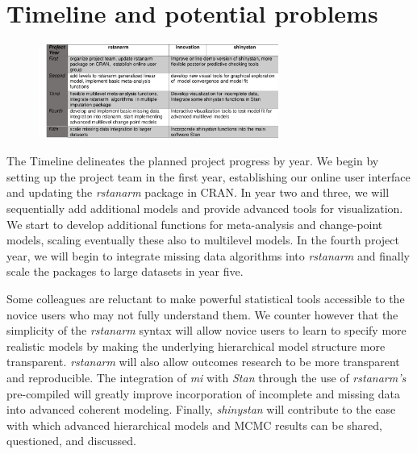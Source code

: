 \documentclass[11pt,notitlepage]{article}
\begin{document}
\section*{Timeline and potential problems}

\begin{figure} %
 \vspace*{-12pt}
    \centering
  \includegraphics[width=0.7\textwidth]{Figures/Timeline.pdf}
 \vspace*{-15pt}
\end{figure}

The Timeline delineates the planned project progress by year. We begin by setting up the project team in 
the first year, establishing our online user interface and updating the \textit{rstanarm} package in CRAN. 
In year two and three, we will sequentially add additional models and provide advanced tools 
for visualization. We start to develop additional functions for meta-analysis and 
change-point models, scaling eventually these also to multilevel models. In the fourth project year, we will begin to integrate 
missing data algorithms into \textit{rstanarm} and finally scale the packages to large datasets in year five.

Some colleagues are reluctant to make powerful statistical tools accessible to the novice users 
who may not fully understand them. We counter 
however that the simplicity of the \textit{rstanarm} syntax will allow novice users to learn to specify more realistic models by 
making the underlying hierarchical model structure more transparent.  \textit{rstanarm} will also allow outcomes research to be 
more transparent and reproducible. The integration of \textit{mi} with \textit{Stan} through the use of 
\textit{rstanarm's} pre-compiled will greatly improve incorporation of incomplete and missing data into 
advanced coherent modeling. Finally, \textit{shinystan} will contribute to the ease 
with which advanced hierarchical models and MCMC results can be shared, questioned, and discussed.

\newpage 

\newpage


\end{document}

